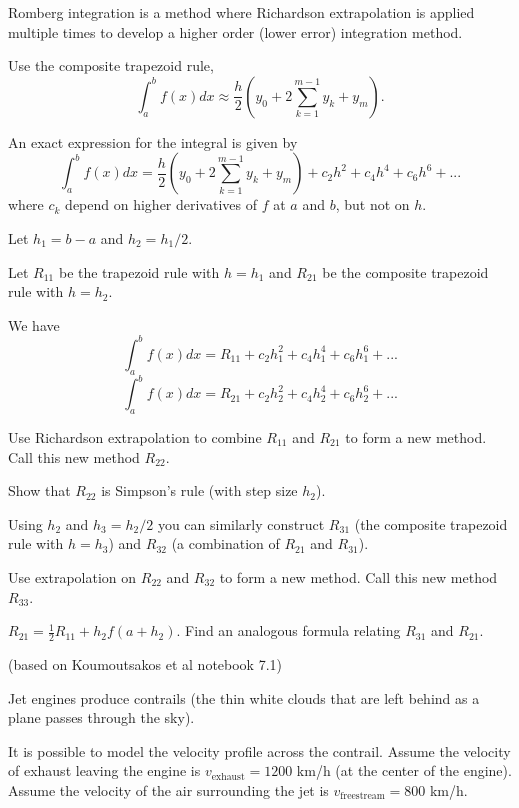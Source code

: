 \documentclass[12pt,letterpaper,noanswers]{exam}
\begin{document}
\begin{questions}
Romberg integration is a method where Richardson extrapolation is applied multiple times to develop a higher order (lower error) integration method.

Use the composite trapezoid rule, \[\displaystyle\int_a^b f(x) dx \approx \frac{h}{2}\left(y_0 + 2\sum\limits_{k=1}^{m-1}y_k  + y_m\right).\]

An exact expression for the integral is given by 
\[\displaystyle\int_a^b f(x) dx = \frac{h}{2}\left(y_0 + 2\sum\limits_{k=1}^{m-1}y_k  + y_m\right) + c_2h^2+c_4h^4+c_6h^6+...\] where $c_k$ depend on higher derivatives of $f$ at $a$ and $b$, but not on $h$.

\begin{parts}
\item Let $h_1 = b-a$ and $h_2 = h_1/2$.

Let $R_{11}$ be the trapezoid rule with $h = h_1$ and $R_{21}$ be the composite trapezoid rule with $h = h_2$.

We have 
\[\int_a^b f(x) dx = R_{11} + c_2h_1^2 + c_4h_1^4 + c_6h_1^6+...\]
\[\int_a^b f(x) dx = R_{21} + c_2h_2^2 + c_4h_2^4 + c_6h_2^6+...\]

Use Richardson extrapolation to combine $R_{11}$ and $R_{21}$ to form a new method.  Call this new method $R_{22}$.
\item Show that $R_{22}$ is Simpson's rule (with step size $h_2$).
\item Using $h_2$ and $h_3 = h_2/2$ you can similarly construct $R_{31}$ (the composite trapezoid rule with $h = h_3$) and $R_{32}$ (a combination of $R_{21}$ and $R_{31}$).

Use extrapolation on $R_{22}$ and $R_{32}$ to form a new method.  Call this new method $R_{33}$.

\item $R_{21} = \frac{1}{2}R_{11}+h_2 f(a+h_2)$.  Find an analogous formula relating $R_{31}$ and $R_{21}$.
\end{parts}

\item (based on Koumoutsakos et al notebook 7.1)

Jet engines produce contrails (the thin white clouds that are left behind as a plane passes through the sky).

It is possible to model the velocity profile across the contrail. Assume the velocity of exhaust leaving the engine is $v_{\text{exhaust}} = 1200$ km/h (at the center of the engine).  Assume the velocity of the air surrounding the jet is $v_{\text{freestream}} = 800$ km/h.


\end{questions}
\end{document}
